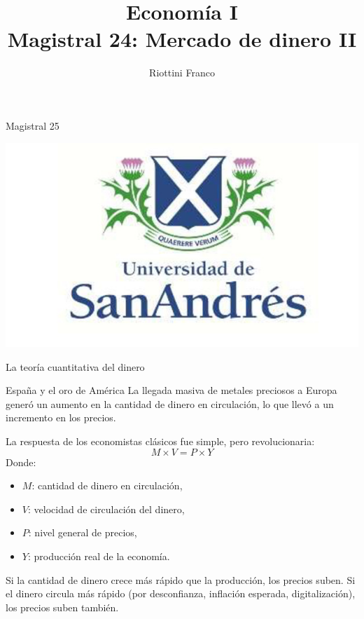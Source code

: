 \documentclass{beamer}
\title[Economía I]{Economía I \vspace{4mm}
\\ Magistral 24: Mercado de dinero II}
\date{}
\author[Franco Riottini]{Riottini Franco}
\institute[]{Universidad de San Andrés}
\begin{document}
\begin{frame}
\titlepage
\centering
Magistral 25

\includegraphics[scale=0.2]{../Figures/logoUDESA.jpg} 
\end{frame}

\begin{frame}{La teoría cuantitativa del dinero}

    \begin{block}{España y el oro de América}
        La llegada masiva de metales preciosos a Europa generó un aumento en la cantidad de dinero en circulación, lo que llevó a un incremento en los precios.
    \end{block}

    La respuesta de los economistas clásicos fue simple, pero revolucionaria:
    \[
    M \times V = P \times Y
    \]
    Donde:
    \begin{itemize}
        \item \(M\): cantidad de dinero en circulación,
        \item \(V\): velocidad de circulación del dinero,
        \item \(P\): nivel general de precios,
        \item \(Y\): producción real de la economía.
    \end{itemize}

    Si la cantidad de dinero crece más rápido que la producción, los precios suben. Si el dinero circula más rápido (por desconfianza, inflación esperada, digitalización), los precios suben también.

\end{frame}
\end{document}
